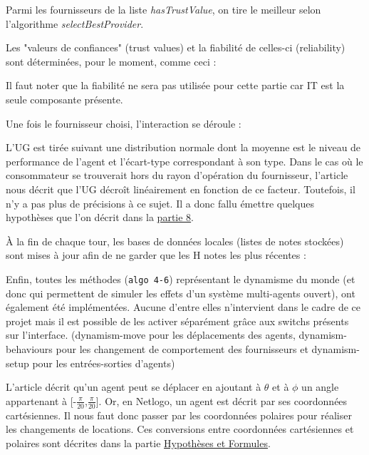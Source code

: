 Parmi les fournisseurs de la liste \textit{hasTrustValue}, on tire le meilleur selon l'algorithme \textit{selectBestProvider}.


Les "valeurs de confiances" (trust values) et la fiabilité de celles-ci (reliability) sont déterminées, pour le moment, comme ceci :


Il faut noter que la fiabilité ne sera pas utilisée pour cette partie car IT est la seule composante présente.

Une fois le fournisseur choisi, l'interaction se déroule :

L'UG est tirée suivant une distribution normale dont la moyenne est le niveau de performance de l'agent et l'écart-type correspondant à son type.
Dans le cas où le consommateur se trouverait hors du rayon d'opération du fournisseur, l'article nous décrit que l'UG décroît linéairement en fonction de ce facteur. Toutefois, il n'y a pas plus de précisions à ce sujet. Il a donc fallu émettre quelques hypothèses que l'on décrit dans la \hyperref[sec:hypotheses]{partie 8}.

À la fin de chaque tour, les bases de données locales (listes de notes stockées) sont mises à jour afin de ne garder que les H notes les plus récentes :


Enfin, toutes les méthodes (\texttt{algo 4-6}) représentant le dynamisme du monde (et donc qui permettent de simuler les effets d'un système multi-agents ouvert), ont également été implémentées. Aucune d'entre elles n'intervient dans le cadre de ce projet mais il est possible de les activer séparément grâce aux switchs présents sur l'interface. (dynamism-move pour les déplacements des agents, dynamism-behaviours pour les changement de comportement des fournisseurs et dynamism-setup pour les entrées-sorties d'agents)

L'article décrit qu'un agent peut se déplacer en ajoutant à $\theta$ et à $\phi$ un angle appartenant à [-$\frac{\pi}{20}$,$\frac{\pi}{20}$]. Or, en Netlogo, un agent est décrit par ses coordonnées cartésiennes. Il nous faut donc passer par les coordonnées polaires pour réaliser les changements de locations. Ces conversions entre coordonnées cartésiennes et polaires sont décrites dans la partie \hyperref[sec:hypotheses]{Hypothèses et Formules}.


